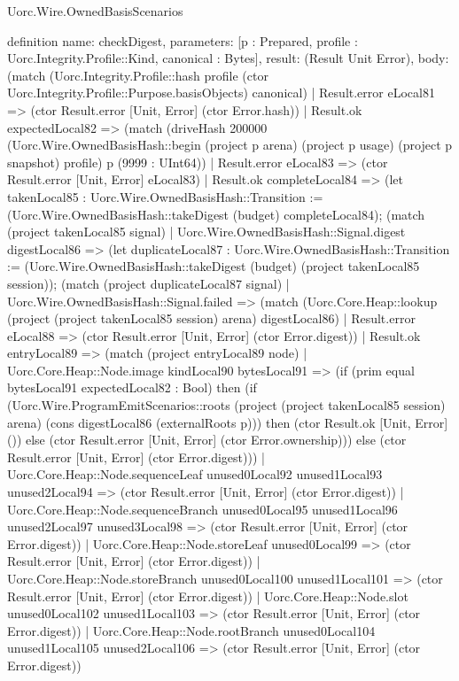 \begin{lexlean}{Uorc.Wire.OwnedBasisScenarios}
\begin{semanticmodule}
definition{
  name: checkDigest,
  parameters: [p : Prepared, profile : Uorc.Integrity.Profile::Kind, canonical : Bytes],
  result: (Result Unit Error),
  body: (match (Uorc.Integrity.Profile::hash profile (ctor Uorc.Integrity.Profile::Purpose.basisObjects) canonical)
    | Result.error eLocal81 => (ctor Result.error [Unit, Error] (ctor Error.hash))
    | Result.ok expectedLocal82 => (match (driveHash 200000 (Uorc.Wire.OwnedBasisHash::begin (project p arena) (project p usage) (project p snapshot) profile) p (9999 : UInt64))
      | Result.error eLocal83 => (ctor Result.error [Unit, Error] eLocal83)
      | Result.ok completeLocal84 => (let takenLocal85 : Uorc.Wire.OwnedBasisHash::Transition := (Uorc.Wire.OwnedBasisHash::takeDigest (budget) completeLocal84); (match (project takenLocal85 signal)
        | Uorc.Wire.OwnedBasisHash::Signal.digest digestLocal86 => (let duplicateLocal87 : Uorc.Wire.OwnedBasisHash::Transition := (Uorc.Wire.OwnedBasisHash::takeDigest (budget) (project takenLocal85 session)); (match (project duplicateLocal87 signal)
          | Uorc.Wire.OwnedBasisHash::Signal.failed => (match (Uorc.Core.Heap::lookup (project (project takenLocal85 session) arena) digestLocal86)
            | Result.error eLocal88 => (ctor Result.error [Unit, Error] (ctor Error.digest))
            | Result.ok entryLocal89 => (match (project entryLocal89 node)
              | Uorc.Core.Heap::Node.image kindLocal90 bytesLocal91 => (if (prim equal bytesLocal91 expectedLocal82 : Bool) then (if (Uorc.Wire.ProgramEmitScenarios::roots (project (project takenLocal85 session) arena) (cons digestLocal86 (externalRoots p))) then (ctor Result.ok [Unit, Error] ()) else (ctor Result.error [Unit, Error] (ctor Error.ownership))) else (ctor Result.error [Unit, Error] (ctor Error.digest)))
              | Uorc.Core.Heap::Node.sequenceLeaf unused0Local92 unused1Local93 unused2Local94 => (ctor Result.error [Unit, Error] (ctor Error.digest))
              | Uorc.Core.Heap::Node.sequenceBranch unused0Local95 unused1Local96 unused2Local97 unused3Local98 => (ctor Result.error [Unit, Error] (ctor Error.digest))
              | Uorc.Core.Heap::Node.storeLeaf unused0Local99 => (ctor Result.error [Unit, Error] (ctor Error.digest))
              | Uorc.Core.Heap::Node.storeBranch unused0Local100 unused1Local101 => (ctor Result.error [Unit, Error] (ctor Error.digest))
              | Uorc.Core.Heap::Node.slot unused0Local102 unused1Local103 => (ctor Result.error [Unit, Error] (ctor Error.digest))
              | Uorc.Core.Heap::Node.rootBranch unused0Local104 unused1Local105 unused2Local106 => (ctor Result.error [Unit, Error] (ctor Error.digest))
}
\end{semanticmodule}
\end{lexlean}
